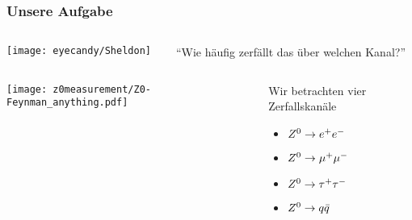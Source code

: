  \begin{frame}
   \frametitle{Unsere Aufgabe}
   \begin{block}{}
     \begin{columns}
       \begin{column}{0.2\textwidth}
         \centering
         \texttt{[image: eyecandy/Sheldon]}
       \end{column}
       \begin{column}{0.8\textwidth}
         ``Wie h\"aufig zerf\"allt das \znull \"uber welchen Kanal?''
       \end{column}
     \end{columns}
   \end{block}
   \vskip1cm
   \begin{columns}
     \begin{column}{0.4\textwidth}
       \centering
       \texttt{[image: z0measurement/Z0-Feynman\_anything.pdf]}
     \end{column}
     \begin{column}{0.05\textwidth}
     \end{column}
     \begin{column}{0.55\textwidth}
       \pause
       \begin{block}{Wir betrachten vier Zerfallskan\"ale}
         \begin{itemize}
         \item $Z^{0}\rightarrow e^{+}e^{-}$
         \item $Z^{0}\rightarrow \mu^{+}\mu^{-}$
         \item $Z^{0}\rightarrow \tau^{+}\tau^{-}$
         \item $Z^{0}\rightarrow q\bar{q}$
         \end{itemize}
       \end{block}
    \end{column}
  \end{columns}
 \end{frame}


